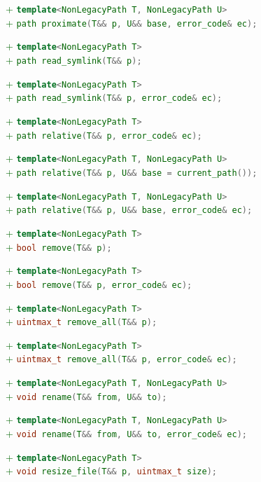 \documentclass[11pt]{article}
\newcommand{\code}[2][cpp]{\lstinline[language=#1,basicstyle=\small\ttfamily]{#2}}
\newcommand{\tsreplace}[3]{\textcolor{red}{\sout{#1}}#2\textcolor{darkgreen}{#3}}
\begin{document}
\tsreplace{}{}{+ \code{template<NonLegacyPath T, NonLegacyPath U>}}\\
\tsreplace{}{}{+ \code{path proximate(T&& p, U&& base, error_code& ec);}}

\tsreplace{}{}{+ \code{template<NonLegacyPath T>}}\\
\tsreplace{}{}{+ \code{path read_symlink(T&& p);}}

\tsreplace{}{}{+ \code{template<NonLegacyPath T>}}\\
\tsreplace{}{}{+ \code{path read_symlink(T&& p, error_code& ec);}}

\tsreplace{}{}{+ \code{template<NonLegacyPath T>}}\\
\tsreplace{}{}{+ \code{path relative(T&& p, error_code& ec);}}

\tsreplace{}{}{+ \code{template<NonLegacyPath T, NonLegacyPath U>}}\\
\tsreplace{}{}{+ \code{path relative(T&& p, U&& base = current_path());}}

\tsreplace{}{}{+ \code{template<NonLegacyPath T, NonLegacyPath U>}}\\
\tsreplace{}{}{+ \code{path relative(T&& p, U&& base, error_code& ec);}}

\tsreplace{}{}{+ \code{template<NonLegacyPath T>}}\\
\tsreplace{}{}{+ \code{bool remove(T&& p);}}

\tsreplace{}{}{+ \code{template<NonLegacyPath T>}}\\
\tsreplace{}{}{+ \code{bool remove(T&& p, error_code& ec);}}

\tsreplace{}{}{+ \code{template<NonLegacyPath T>}}\\
\tsreplace{}{}{+ \code{uintmax_t remove_all(T&& p);}}

\tsreplace{}{}{+ \code{template<NonLegacyPath T>}}\\
\tsreplace{}{}{+ \code{uintmax_t remove_all(T&& p, error_code& ec);}}

\tsreplace{}{}{+ \code{template<NonLegacyPath T, NonLegacyPath U>}}\\
\tsreplace{}{}{+ \code{void rename(T&& from, U&& to);}}

\tsreplace{}{}{+ \code{template<NonLegacyPath T, NonLegacyPath U>}}\\
\tsreplace{}{}{+ \code{void rename(T&& from, U&& to, error_code& ec);}}

\tsreplace{}{}{+ \code{template<NonLegacyPath T>}}\\
\tsreplace{}{}{+ \code{void resize_file(T&& p, uintmax_t size);}}
\end{document}
